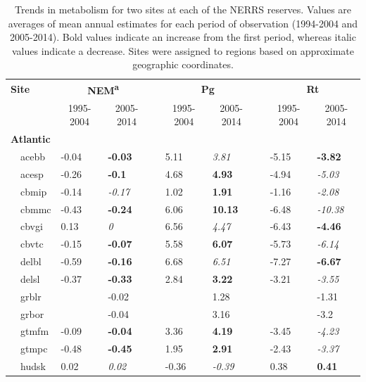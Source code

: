 \begin{table}[!tbp]
{\footnotesize
\caption{Trends in metabolism for two sites at each of the NERRS reserves.  Values are averages of mean annual estimates for each period of observation (1994-2004 and 2005-2014). Bold values indicate an increase from the first period, whereas italic values indicate a decrease. Sites were assigned to regions based on approximate geographic coordinates.\label{tab:metab_tab}} 
\begin{center}
\begin{tabular}{lllcllcll}
\hline\hline
\multicolumn{1}{l}{\bfseries Site}&\multicolumn{2}{c}{\bfseries NEM\textsuperscript{a}}&\multicolumn{1}{c}{\bfseries }&\multicolumn{2}{c}{\bfseries Pg}&\multicolumn{1}{c}{\bfseries }&\multicolumn{2}{c}{\bfseries Rt}\tabularnewline
\cline{2-3} \cline{5-6} \cline{8-9}
\multicolumn{1}{l}{}&\multicolumn{1}{c}{1995-2004}&\multicolumn{1}{c}{2005-2014}&\multicolumn{1}{c}{}&\multicolumn{1}{c}{1995-2004}&\multicolumn{1}{c}{2005-2014}&\multicolumn{1}{c}{}&\multicolumn{1}{c}{1995-2004}&\multicolumn{1}{c}{2005-2014}\tabularnewline
\hline
{\bfseries Atlantic}&&&&&&&&\tabularnewline
~~acebb&-0.04&{\bf -0.03}&&5.11&{\it 3.81}&&-5.15&{\bf -3.82}\tabularnewline
~~acesp&-0.26&{\bf -0.1}&&4.68&{\bf 4.93}&&-4.94&{\it -5.03}\tabularnewline
~~cbmip&-0.14&{\it -0.17}&&1.02&{\bf 1.91}&&-1.16&{\it -2.08}\tabularnewline
~~cbmmc&-0.43&{\bf -0.24}&&6.06&{\bf 10.13}&&-6.48&{\it -10.38}\tabularnewline
~~cbvgi&0.13&{\it 0}&&6.56&{\it 4.47}&&-6.43&{\bf -4.46}\tabularnewline
~~cbvtc&-0.15&{\bf -0.07}&&5.58&{\bf 6.07}&&-5.73&{\it -6.14}\tabularnewline
~~delbl&-0.59&{\bf -0.16}&&6.68&{\it 6.51}&&-7.27&{\bf -6.67}\tabularnewline
~~delsl&-0.37&{\bf -0.33}&&2.84&{\bf 3.22}&&-3.21&{\it -3.55}\tabularnewline
~~grblr&&-0.02&&&1.28&&&-1.31\tabularnewline
~~grbor&&-0.04&&&3.16&&&-3.2\tabularnewline
~~gtmfm&-0.09&{\bf -0.04}&&3.36&{\bf 4.19}&&-3.45&{\it -4.23}\tabularnewline
~~gtmpc&-0.48&{\bf -0.45}&&1.95&{\bf 2.91}&&-2.43&{\it -3.37}\tabularnewline
~~hudsk&0.02&{\it 0.02}&&-0.36&{\it -0.39}&&0.38&{\bf 0.41}\tabularnewline

\end{tabular}
\end{center}}
\end{table}
